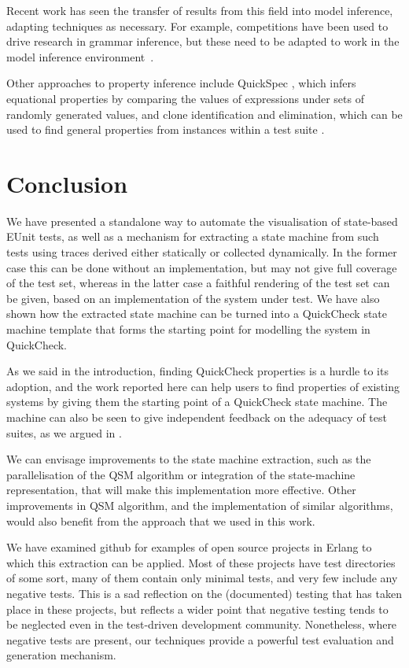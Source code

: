 \documentclass[]{sigplanconf}
\begin{document}
Recent work has seen the transfer of results from this field into model inference, adapting techniques as necessary. For example, competitions have been used to drive research in grammar inference, but these need to be adapted to work in the model inference environment~\cite{STAMINA}. 

Other approaches to property inference include QuickSpec \cite{QuickSpec}, which infers equational properties by comparing the values of expressions under sets of randomly generated values, and clone identification and elimination, which can be used to find general properties from instances within a test suite \cite{RefTest2011}.



\section{Conclusion}
\label{conc}


We have presented a standalone way to automate the visualisation
of state-based EUnit tests, as well as a mechanism for extracting a state machine from such tests using traces derived either statically or collected dynamically. In the former case this can be done without an implementation, but may not give full coverage of the test set, whereas in the latter case a faithful rendering of the test set can be given, based on an implementation of the system under test.
We have also shown how the extracted state machine can be turned into a QuickCheck state machine template that forms the starting point for modelling the system in QuickCheck. 

As we said in the introduction, finding QuickCheck properties is a hurdle to its adoption, and the work reported here can help users to find properties of existing systems by giving them the starting point of a QuickCheck state machine. The machine can also be seen to give independent feedback on the adequacy of test suites, as we argued in \cite{arts2010test}.

We can envisage improvements to the state machine extraction, such as the  parallelisation of the QSM
algorithm or integration of the state-machine representation, that
will make this implementation more effective. Other improvements
in QSM algorithm, and the implementation of similar algorithms,
would also benefit from the approach that we
used in this work.

We have examined github for examples of open source projects in Erlang to which this extraction can be applied. Most of these projects have test directories of some sort, many of them contain only minimal tests, and very few include any negative tests. This is a sad reflection on the (documented) testing that has taken place in these projects, but reflects a wider point that negative testing tends to be neglected even in the test-driven development community. Nonetheless, where negative tests are present, our techniques provide a powerful test evaluation and generation mechanism. 
\end{document}

